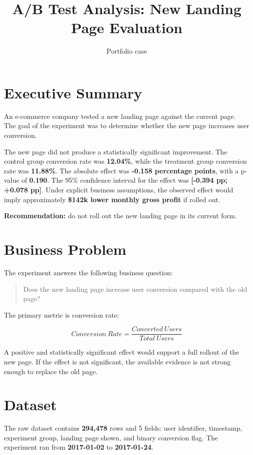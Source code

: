 \documentclass[11pt,a4paper]{article}
\title{\textbf{A/B Test Analysis: New Landing Page Evaluation}}
\author{Portfolio case}
\date{}
\begin{document}
\maketitle

\section*{Executive Summary}

An e-commerce company tested a new landing page against the current page.
The goal of the experiment was to determine whether the new page increases user conversion.

The new page did not produce a statistically significant improvement.
The control group conversion rate was \textbf{12.04\%}, while the treatment group conversion rate was \textbf{11.88\%}.
The absolute effect was \textbf{-0.158 percentage points}, with a p-value of \textbf{0.190}.
The 95\% confidence interval for the effect was \textbf{[-0.394 pp; +0.078 pp]}.
Under explicit business assumptions, the observed effect would imply approximately \textbf{\$142k lower monthly gross profit} if rolled out.

\vspace{0.3cm}
\noindent
\textbf{Recommendation:} do not roll out the new landing page in its current form.

\section{Business Problem}

The experiment answers the following business question:

\begin{quote}
Does the new landing page increase user conversion compared with the old page?
\end{quote}

The primary metric is conversion rate:

\[
Conversion\ Rate = \frac{Converted\ Users}{Total\ Users}
\]

A positive and statistically significant effect would support a full rollout of the new page.
If the effect is not significant, the available evidence is not strong enough to replace the old page.

\section{Dataset}

The raw dataset contains \textbf{294,478} rows and 5 fields: user identifier, timestamp,
experiment group, landing page shown, and binary conversion flag.
The experiment ran from \textbf{2017-01-02} to \textbf{2017-01-24}.
\end{document}
